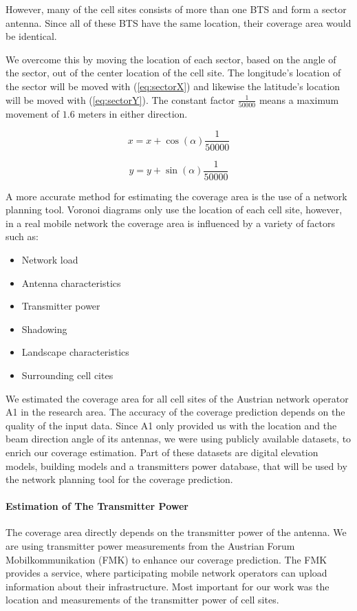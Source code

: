 However, many of the cell sites consists of more than one BTS and form a sector antenna. Since all of these BTS have the same location, their coverage area would be identical.

We overcome this by moving the location of each sector, based on the angle of the sector, out of the center location of the cell site. The longitude's location of the sector will be moved with (\ref{eq:sectorX}) and likewise the latitude's location will be moved with (\ref{eq:sectorY}). The constant factor $\frac{1}{50000}$ means a maximum movement of $1.6$ meters in either direction.

\begin{equation}
	x  =x+\cos(\alpha)\frac{1}{50000}\label{eq:sectorX}
\end{equation}

\begin{equation}
	y =y+\sin(\alpha)\frac{1}{50000}\label{eq:sectorX}
\end{equation}
\newline

A more accurate method for estimating the coverage area is the use of a network planning tool. Voronoi diagrams only use the location of each cell site, however, in a real mobile network the coverage area is influenced by a variety of factors such as:
\begin{itemize}
	\item Network load
	\item Antenna characteristics
	\item Transmitter power
	\item Shadowing
	\item Landscape characteristics
	\item Surrounding cell cites
\end{itemize}

We estimated the coverage area for all cell sites of the Austrian network operator A1 in the research area. The accuracy of the coverage prediction depends on the quality of the input data. Since A1 only provided us with the location and the beam direction angle of its antennas, we were using publicly available datasets, to enrich our coverage estimation. Part of these datasets are digital elevation models, building models and a transmitters power database, that will be used by the network planning tool for the coverage prediction.

\paragraph{Estimation of The Transmitter Power}
The coverage area directly depends on the transmitter power of the antenna. We are using transmitter power measurements from the Austrian Forum Mobilkommunikation (FMK) to enhance our coverage prediction. The FMK provides a service, where participating mobile network operators can upload information about their infrastructure. Most important for our work was the location and measurements of the transmitter power of cell sites.


